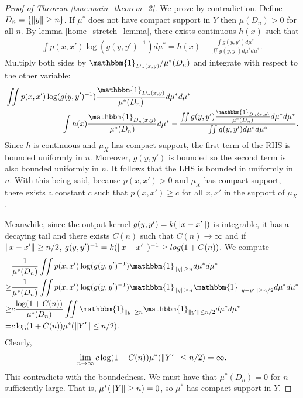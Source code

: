 \begin{proof}[Proof of Theorem \ref{tsne:main_theorem_2}]
    We prove by contradiction. Define $D_n = \{\left\lVert y\right\rVert \geq n\}$. If $\mu^*$ does not have compact support in $Y$ then $\mu(D_n)>0$ for all $n$. By lemma \ref{home_stretch_lemma}, there exists continuous $h(x)$ such that
    \begin{align}
        \int p(x,x') \log(g(y,y')^{-1})d\mu^* = h(x) -  \frac{\int g(y,y')d\mu^*}{\iint g(y,y')d\mu^* d\mu^*}.
    \end{align}
    Multiply both sides by $\mathbbm{1}_{D_n(x,y)}/\mu^*(D_n)$ and integrate with respect to the other variable:
    \begin{align}
         & \iint p(x,x') \log(g(y,y')^{-1}) \frac{\mathbbm{1}_{D_n(x,y)}}{\mu^*(D_n)}d\mu^* d\mu^* \nonumber                                                                                          \\
         & \qquad \qquad \qquad= \int h(x)\frac{\mathbbm{1}_{D_n(x,y)}}{\mu^*(D_n)}d\mu^* -  \frac{\iint g(y,y')\frac{\mathbbm{1}_{D_n(x,y)}}{\mu^*(D_n)} d\mu^* d\mu^*}{\iint g(y,y')d\mu^* d\mu^*}.
    \end{align}
    Since $h$ is continuous and $\mu_X$ has compact support, the first term of the RHS is bounded uniformly in $n$. Moreover, $g(y,y')$  is bounded so the second term is also bounded uniformly in $n$. It follows that the LHS is bounded in uniformly in $n$. With this being said, because $p(x,x')>0$ and $\mu_X$ has compact support, there exists a constant $c$ such that $p(x,x') \geq c$ for all $x,x'$ in the support of $\mu_X$.

    Meanwhile, since the output kernel $g(y,y') = k(\left\lVert x-x'\right\rVert)$ is integrable, it
    has a decaying tail and there exists $C(n)$ such that $C(n) \to \infty$ and if
    $\left\lVert x-x'\right\rVert \geq n/2$, $g(y,y')^{-1}=k(\left\lVert x-x'\right\rVert)^{-1} \geq log (1+C(n))$.
    We compute
    \begin{align}
             & \frac{1}{\mu^*(D_n)} \iint p(x,x') \log(g(y,y')^{-1}) \mathbbm{1}_{\norm{y} \geq n} d\mu^* d\mu^* \nonumber                                   \\
        \geq & \frac{1}{\mu^*(D_n)} \iint p(x,x') \log(g(y,y')^{-1}) \mathbbm{1}_{\norm{y} \geq n} \mathbbm{1}_{\norm{y-y'} \geq n/2}d\mu^* d\mu^* \nonumber \\
        \geq & c \frac{\log(1+C(n))}{\mu^*(D_n)} \iint \mathbbm{1}_{\norm{y} \geq n} \mathbbm{1}_{\norm{y'} \leq n/2}d\mu^* d\mu^* \nonumber                 \\
        =    & c\log(1+C(n)) \mu^*(\norm{Y'}\leq n/2).
    \end{align}
    Clearly,
    \begin{align}
        \lim_{n \to \infty} c\log(1+C(n)) \mu^*(\left\lVert Y'\right\rVert\leq n/2) = \infty.
    \end{align}
    This contradicts with the boundedness. We must have that $\mu^*(D_n)=0$ for $n$ sufficiently large. That is, $\mu^*(\left\lVert Y\right\rVert \geq n)=0$, so $\mu^*$ has compact support in $Y$.
\end{proof}
